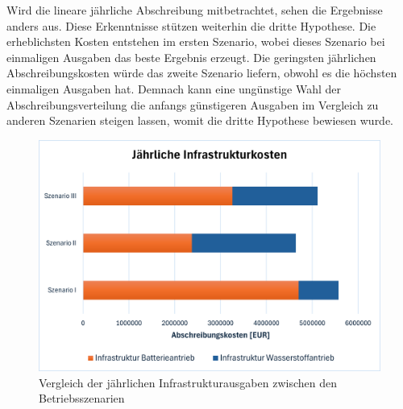 %
Wird die lineare jährliche Abschreibung mitbetrachtet, sehen die Ergebnisse anders aus. 
Diese Erkenntnisse stützen weiterhin die dritte Hypothese.
Die erheblichsten Kosten entstehen im ersten Szenario, 
wobei dieses Szenario bei einmaligen Ausgaben das beste Ergebnis erzeugt.
Die geringsten jährlichen Abschreibungskosten würde das zweite Szenario liefern, 
obwohl es die höchsten einmaligen Ausgaben hat. 
Demnach kann eine ungünstige Wahl der Abschreibungsverteilung die anfangs günstigeren Ausgaben 
im Vergleich zu anderen Szenarien steigen lassen, womit die dritte Hypothese bewiesen wurde.
%
\begin{figure}[h]
	\centering
	\includegraphics[width=0.8\linewidth]{Bilder/infr_abschreibung.png}
	\caption[Vergleich der jährlichen Infrastrukturausgaben zwischen den Betriebsszenarien]{Vergleich der jährlichen Infrastrukturausgaben zwischen den Betriebsszenarien}
	\label{res_betriebsszenarien}
\end{figure}

